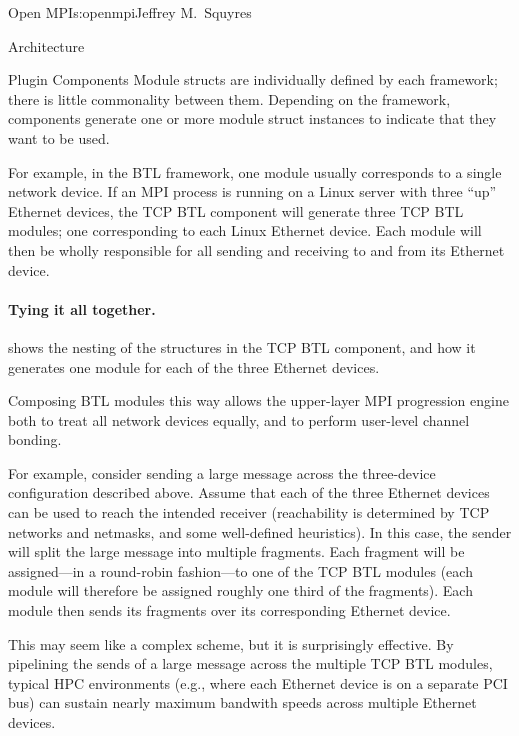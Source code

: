 \begin{aosachapter}{Open MPI}{s:openmpi}{Jeffrey M.\ Squyres}
\begin{aosasect1}{Architecture}
\begin{aosasect2}{Plugin Components}
Module structs are individually defined by each framework; there is
little commonality between them.
%
Depending on the framework, components generate one or more module
struct instances to indicate that they want to be used.

For example, in the BTL framework, one module usually corresponds to a
single network device.  
%
If an MPI process is running on a Linux server with three ``up''
Ethernet devices, the TCP BTL component will generate three TCP BTL
modules; one corresponding to each Linux Ethernet device.
%
Each module will then be wholly responsible for all sending and
receiving to and from its Ethernet device.


\paragraph{Tying it all together.}
 shows the nesting of the
structures in the TCP BTL component, and how it generates one module
for each of the three Ethernet devices.


Composing BTL modules this way allows the upper-layer MPI progression
engine both to treat all network devices equally, and to perform
user-level channel bonding.  

For example, consider sending a large message across the three-device
configuration described above.  Assume that each of the three Ethernet
devices can be used to reach the intended receiver (reachability is
determined by TCP networks and netmasks, and some well-defined
heuristics).
%
In this case, the sender will split the large message into multiple
fragments.  Each fragment will be assigned---in a round-robin
fashion---to one of the TCP BTL modules (each module will therefore be
assigned roughly one third of the fragments).
%
Each module then sends its fragments over its corresponding Ethernet
device.

This may seem like a complex scheme, but it is surprisingly
effective.  
%
By pipelining the sends of a large message across the multiple TCP BTL
modules, typical HPC environments (e.g., where each Ethernet device is
on a separate PCI bus) can sustain nearly maximum bandwith speeds
across multiple Ethernet devices.


\end{aosasect2}
\end{aosasect1}
\end{aosachapter}
